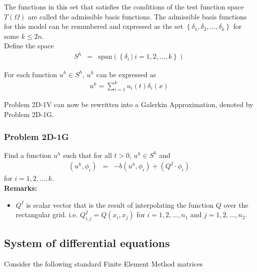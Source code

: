 \documentclass[../../main.tex]{subfiles}
\begin{document}
The functions in this set that satisfies the conditions of the test function space $T(\Omega)$ are called the admissible basis functions. The admissible basis functions for this model can be renumbered and expressed as the set $\left \{\delta_1, \delta_2,..., \delta_k \right\}$ for some $k \leq 2n$.\\

Define the space
\begin{eqnarray*}
S^h & = & \textrm{span}\left(\left\{\delta_i \ | \ i = 1,2,...,k \right\} \right)
\end{eqnarray*}

For each function $u^h \in S^h$, $u^h$ can be expressed as
\begin{eqnarray*}
	u^h = \sum_{i = 1}^{k} u_i(t) \delta_{i}(x)
\end{eqnarray*}

Problem 2D-1V can now be rewritten into a Galerkin Approximation, denoted by Problem 2D-1G.

\subsubsection{Problem 2D-1G}
Find a function $u^h$ such that for all $t>0$, $u^h \in S^h$ and
\begin{eqnarray*}
	(u^h, \phi_i) & = & -b(u^h,\phi_i) + (Q^I \cdot \phi_i)
\end{eqnarray*} for $i = 1,2,...,k$.\\

\textbf{Remarks:}
\begin{itemize}
	\item[] $Q^I$ is scalar vector that is the result of interpolating the function $Q$ over the rectangular grid. i.e. $Q^I_{i,j} = Q(x_i,x_j)$ for $i = 1,2,...,n_1$ and $j = 1,2,...,n_2$.
\end{itemize}

\subsection{System of differential equations}\label{ssec:2DFEM:DE}

Consider the following standard Finite Element Method matrices
\end{document}
